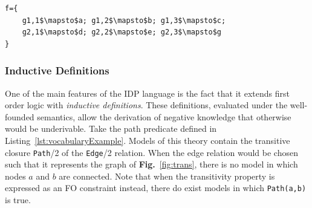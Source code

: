 \begin{minipage}{\linewidth}
    \begin{minipage}{0.5\linewidth}
    \begin{lstlisting}[mathescape,caption={A possible assignment for f s.t. it represents no homomorphism from Fig.~\ref{fig:ex2-cand} to Fig.~\ref{fig:ex2-neg}}, label=lst:invalidf]
f={
    g1,1$\mapsto$a; g1,2$\mapsto$b; g1,3$\mapsto$c;
    g2,1$\mapsto$d; g2,2$\mapsto$e; g2,3$\mapsto$g
}
    \end{lstlisting}
    \end{minipage}
    \begin{minipage}{0.5\linewidth}
    \centering
   \label{fig:trans}
    \end{minipage}
\end{minipage}



\subsubsection{Inductive Definitions}
One of the main features of the IDP language is the fact that it extends first order logic with \emph{inductive definitions}. These definitions, evaluated under the well-founded semantics, allow the derivation of negative knowledge that otherwise would be underivable.
Take the path predicate defined in Listing~\ref{lst:vocabularyExample}.
Models of this theory contain the transitive closure \lstinline|Path|/2 of the \lstinline|Edge|/2 relation.
When the edge relation would be chosen such that it represents the graph of \textbf{Fig.}~\ref{fig:trans}, there is no model in which nodes $a$ and $b$ are connected. Note that when the transitivity property is expressed as an FO constraint instead, there do exist models in which \lstinline|Path(a,b)| is true.

